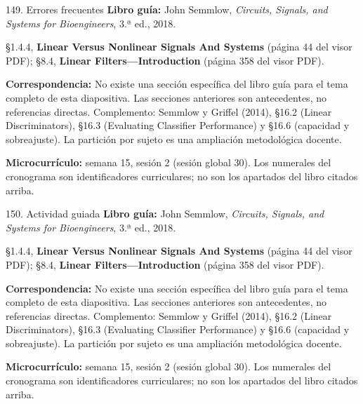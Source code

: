 \documentclass[
  10pt,
  ignorenonframetext,
  aspectratio=169,
  spanish,
]{beamer}
\begin{document}
\begin{frame}{149. Errores frecuentes}
\label{errores-frecuentes-9}
\textbf{Libro guía:} John Semmlow, \emph{Circuits, Signals, and Systems
for Bioengineers}, 3.ª ed., 2018.

§1.4.4, \textbf{Linear Versus Nonlinear Signals And Systems} (página 44
del visor PDF); §8.4, \textbf{Linear Filters---Introduction} (página 358
del visor PDF).

\textbf{Correspondencia:} No existe una sección específica del libro
guía para el tema completo de esta diapositiva. Las secciones anteriores
son antecedentes, no referencias directas. Complemento: Semmlow y
Griffel (2014), §16.2 (Linear Discriminators), §16.3 (Evaluating
Classifier Performance) y §16.6 (capacidad y sobreajuste). La partición
por sujeto es una ampliación metodológica docente.

\textbf{Microcurrículo:} semana 15, sesión 2 (sesión global 30). Los
numerales del cronograma son identificadores curriculares; no son los
apartados del libro citados arriba.
\end{frame}

\begin{frame}{150. Actividad guiada}
\label{actividad-guiada-9}
\textbf{Libro guía:} John Semmlow, \emph{Circuits, Signals, and Systems
for Bioengineers}, 3.ª ed., 2018.

§1.4.4, \textbf{Linear Versus Nonlinear Signals And Systems} (página 44
del visor PDF); §8.4, \textbf{Linear Filters---Introduction} (página 358
del visor PDF).

\textbf{Correspondencia:} No existe una sección específica del libro
guía para el tema completo de esta diapositiva. Las secciones anteriores
son antecedentes, no referencias directas. Complemento: Semmlow y
Griffel (2014), §16.2 (Linear Discriminators), §16.3 (Evaluating
Classifier Performance) y §16.6 (capacidad y sobreajuste). La partición
por sujeto es una ampliación metodológica docente.

\textbf{Microcurrículo:} semana 15, sesión 2 (sesión global 30). Los
numerales del cronograma son identificadores curriculares; no son los
apartados del libro citados arriba.
\end{frame}
\end{document}
